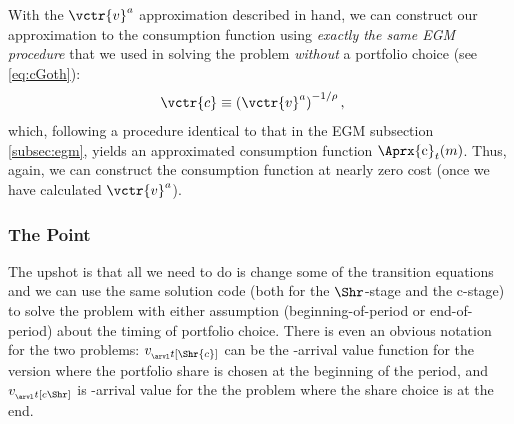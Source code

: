 \documentclass[titlepage, headings=optiontotocandhead]{econtex}
\begin{document}
With the $\vctr{v}^{a}$ approximation described in hand, we can construct our approximation to the consumption function using \emph{exactly the same EGM procedure} that we used in solving the problem \emph{without} a portfolio choice (see \eqref{eq:cGoth}):
\begin{equation}\begin{gathered}\begin{aligned}
      \vctr{c}  & \equiv  \left(\vctr{v}^{a}\right)^{-1/\rho} \label{eq:cVecPort},
    \end{aligned}\end{gathered}\end{equation}
which, following a procedure identical to that in the EGM subsection \ref{subsec:egm}, yields an approximated consumption function $\Aprx{\mathrm{c}}_{t}(m)$.  Thus, again, we can construct the consumption function at nearly zero cost (once we have calculated $\vctr{v}^{a}$).

\hypertarget{the-point}{}

\subsubsection{The Point}\label{subsubsec:the-point}

The upshot is that all we need to do is change some of the transition equations and we can use the same solution code (both for the $\Shr$-stage and the $\mathrm{c}$-stage) to solve the problem with either assumption (beginning-of-period or end-of-period) about the timing of portfolio choice.  There is even an obvious notation for the two problems: $v_{_\arvl t[\Shr{c}]}$ can be the {\interval}-arrival value function for the version where the portfolio share is chosen at the beginning of the period, and $v_{_\arvl t[{c}\Shr]}$ is {\interval}-arrival value for the the problem where the share choice is at the end.
\end{document}

